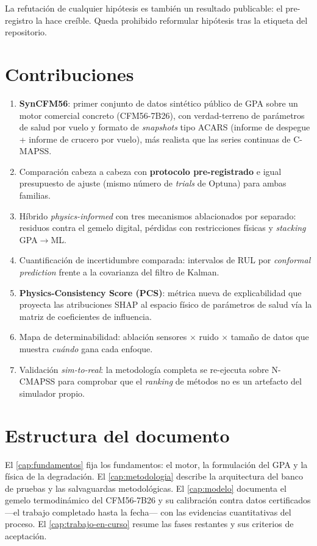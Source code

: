 La refutación de cualquier hipótesis es también un resultado publicable: el pre-registro la hace
creíble. Queda prohibido reformular hipótesis tras la etiqueta  del
repositorio.

\section{Contribuciones}
\label{sec:contribuciones}

\begin{enumerate}
  \item[\textbf{C1.}] \textbf{SynCFM56}: primer conjunto de datos sintético público de GPA sobre
    un motor comercial concreto (CFM56-7B26), con verdad-terreno de parámetros de salud por
    vuelo y formato de \emph{snapshots} tipo ACARS (informe de despegue + informe de crucero por
    vuelo), más realista que las series continuas de C-MAPSS.
  \item[\textbf{C2.}] Comparación cabeza a cabeza con \textbf{protocolo pre-registrado} e igual
    presupuesto de ajuste (mismo número de \emph{trials} de Optuna) para ambas familias.
  \item[\textbf{C3.}] Híbrido \emph{physics-informed} con tres mecanismos ablacionados por
    separado: residuos contra el gemelo digital, pérdidas con restricciones físicas y
    \emph{stacking} GPA$\rightarrow$ML.
  \item[\textbf{C4.}] Cuantificación de incertidumbre comparada: intervalos de RUL por
    \emph{conformal prediction} frente a la covarianza del filtro de Kalman.
  \item[\textbf{C5.}] \textbf{Physics-Consistency Score (PCS)}: métrica nueva de explicabilidad
    que proyecta las atribuciones SHAP al espacio físico de parámetros de salud vía la matriz de
    coeficientes de influencia.
  \item[\textbf{C6.}] Mapa de determinabilidad: ablación sensores $\times$ ruido $\times$ tamaño
    de datos que muestra \emph{cuándo} gana cada enfoque.
  \item[\textbf{C7.}] Validación \emph{sim-to-real}: la metodología completa se re-ejecuta sobre
    N-CMAPSS para comprobar que el \emph{ranking} de métodos no es un artefacto del simulador
    propio.
\end{enumerate}

\section{Estructura del documento}

El \cref{cap:fundamentos} fija los fundamentos: el motor, la formulación del GPA y la física de
la degradación. El \cref{cap:metodologia} describe la arquitectura del banco de pruebas y las
salvaguardas metodológicas. El \cref{cap:modelo} documenta el gemelo termodinámico del
CFM56-7B26 y su calibración contra datos certificados ---el trabajo completado hasta la fecha---
con las evidencias cuantitativas del proceso. El \cref{cap:trabajo-en-curso} resume las fases
restantes y sus criterios de aceptación.
